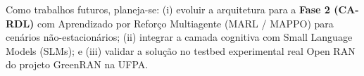 \documentclass[12pt]{article}
\begin{document}
Como trabalhos futuros, planeja-se: (i) evoluir a arquitetura para a \textbf{Fase 2 (CA-RDL)} com Aprendizado por Reforço Multiagente (MARL / MAPPO) para cenários não-estacionários; (ii) integrar a camada cognitiva com Small Language Models (SLMs); e (iii) validar a solução no testbed experimental real Open RAN do projeto GreenRAN na UFPA.



\end{document}

